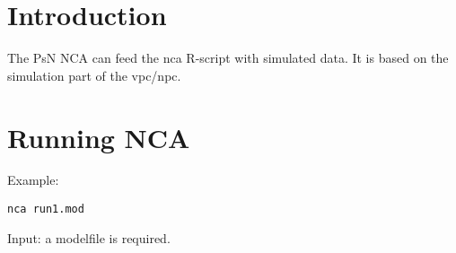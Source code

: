 



\maketitle

\section{Introduction}
The PsN NCA can feed the nca R-script with simulated data. It is based on the simulation part of the vpc/npc.

\section{Running NCA}
Example:

\begin{verbatim}
nca run1.mod
\end{verbatim}

Input: a modelfile is required.

